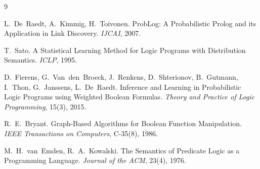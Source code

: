 \documentclass[11pt,a4paper]{article}
\theoremstyle{definition}
\begin{document}
\begin{thebibliography}{9}

L.~De~Raedt, A.~Kimmig, H.~Toivonen.
\newblock ProbLog: A Probabilistic Prolog and its Application in Link Discovery.
\newblock \emph{IJCAI}, 2007.

T.~Sato.
\newblock A Statistical Learning Method for Logic Programs with Distribution Semantics.
\newblock \emph{ICLP}, 1995.

D.~Fierens, G.~Van~den~Broeck, J.~Renkens, D.~Shterionov, B.~Gutmann,
I.~Thon, G.~Janssens, L.~De~Raedt.
\newblock Inference and Learning in Probabilistic Logic Programs using
Weighted Boolean Formulas.
\newblock \emph{Theory and Practice of Logic Programming}, 15(3), 2015.

R.~E.~Bryant.
\newblock Graph-Based Algorithms for Boolean Function Manipulation.
\newblock \emph{IEEE Transactions on Computers}, C-35(8), 1986.

M.~H.~van~Emden, R.~A.~Kowalski.
\newblock The Semantics of Predicate Logic as a Programming Language.
\newblock \emph{Journal of the ACM}, 23(4), 1976.

\end{thebibliography}
\end{document}
